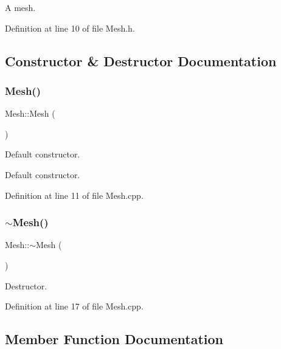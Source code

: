  



 

A mesh. 

Definition at line 10 of file Mesh.\+h.



\subsection{Constructor \& Destructor Documentation}
\mbox{\label{class_mesh_a2af137f1571af89172b9c102302c416b}} 
\subsubsection{\texorpdfstring{Mesh()}{Mesh()}}
{\footnotesize\ttfamily Mesh\+::\+Mesh (\begin{DoxyParamCaption}{ }\end{DoxyParamCaption})}



Default constructor. 







 

Default constructor. 

Definition at line 11 of file Mesh.\+cpp.

\mbox{\label{class_mesh_a5efe4da1a4c0971cfb037bd70304c303}} 
\subsubsection{\texorpdfstring{$\sim$\+Mesh()}{~Mesh()}}
{\footnotesize\ttfamily Mesh\+::$\sim$\+Mesh (\begin{DoxyParamCaption}{ }\end{DoxyParamCaption})}



Destructor. 



Definition at line 17 of file Mesh.\+cpp.



\subsection{Member Function Documentation}
\mbox{\label{class_mesh_a11a25c85c24c954d89ea0442c8b7b055}} 
